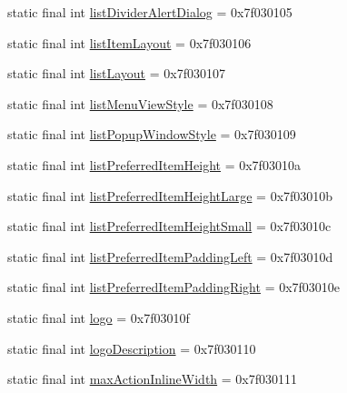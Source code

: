 \begin{DoxyCompactItemize}
\item 
static final int \mbox{\hyperlink{classandroid_1_1support_1_1design_1_1_r_1_1attr_a7218bfb0fa2e50c3a1ce684d85659d65}{list\+Divider\+Alert\+Dialog}} = 0x7f030105
\item 
static final int \mbox{\hyperlink{classandroid_1_1support_1_1design_1_1_r_1_1attr_a9a81a0eeb365ab02776b4193e8c9841e}{list\+Item\+Layout}} = 0x7f030106
\item 
static final int \mbox{\hyperlink{classandroid_1_1support_1_1design_1_1_r_1_1attr_ad95a0616f4a1878b1272b321ae0d6643}{list\+Layout}} = 0x7f030107
\item 
static final int \mbox{\hyperlink{classandroid_1_1support_1_1design_1_1_r_1_1attr_a834806ce5817ca88a132020fd2daf773}{list\+Menu\+View\+Style}} = 0x7f030108
\item 
static final int \mbox{\hyperlink{classandroid_1_1support_1_1design_1_1_r_1_1attr_acf2c1b6bb6704c1f06dbe90919c79260}{list\+Popup\+Window\+Style}} = 0x7f030109
\item 
static final int \mbox{\hyperlink{classandroid_1_1support_1_1design_1_1_r_1_1attr_ac146c33bf42aacb55e4473dac7bf0fd4}{list\+Preferred\+Item\+Height}} = 0x7f03010a
\item 
static final int \mbox{\hyperlink{classandroid_1_1support_1_1design_1_1_r_1_1attr_a26d81f51fda6b3aaf060fb3825462686}{list\+Preferred\+Item\+Height\+Large}} = 0x7f03010b
\item 
static final int \mbox{\hyperlink{classandroid_1_1support_1_1design_1_1_r_1_1attr_ae7b6ec3bd46a7fbd1938d23ec3f57839}{list\+Preferred\+Item\+Height\+Small}} = 0x7f03010c
\item 
static final int \mbox{\hyperlink{classandroid_1_1support_1_1design_1_1_r_1_1attr_ac75887474ec5c89c252beb2b064a0eee}{list\+Preferred\+Item\+Padding\+Left}} = 0x7f03010d
\item 
static final int \mbox{\hyperlink{classandroid_1_1support_1_1design_1_1_r_1_1attr_a2d502456002007ee5f878ec50be47732}{list\+Preferred\+Item\+Padding\+Right}} = 0x7f03010e
\item 
static final int \mbox{\hyperlink{classandroid_1_1support_1_1design_1_1_r_1_1attr_a6cb97c1d0d1533a2cc41e9986396106c}{logo}} = 0x7f03010f
\item 
static final int \mbox{\hyperlink{classandroid_1_1support_1_1design_1_1_r_1_1attr_a123f4a014736d0e9ef5f5107f31ff5a2}{logo\+Description}} = 0x7f030110
\item 
static final int \mbox{\hyperlink{classandroid_1_1support_1_1design_1_1_r_1_1attr_a81c927e3906843a45e2c66052578cb03}{max\+Action\+Inline\+Width}} = 0x7f030111

\end{DoxyCompactItemize}
